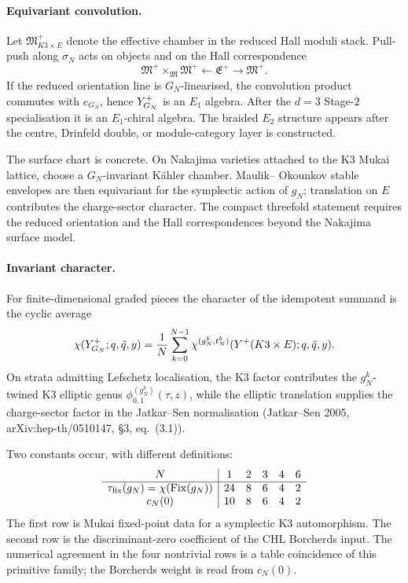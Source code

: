 \paragraph{Equivariant convolution.}
Let $\mathfrak{M}^{+}_{K3\times E}$ denote the effective chamber in the
reduced Hall moduli stack.  Pull-push along $\sigma_N$ acts on objects
and on the Hall correspondence
\[
  \mathfrak{M}^{+}\times_{\mathfrak{M}}\mathfrak{M}^{+}
  \longleftarrow
  \mathfrak{E}^{+}
  \longrightarrow
  \mathfrak{M}^{+}.
\]
If the reduced orientation line is $G_N$-linearised, the convolution
product commutes with $e_{G_N}$, hence $Y^{+}_{G_N}$ is an $E_1$ algebra.
After the $d=3$ Stage-$2$ specialisation it is an $E_1$-chiral algebra.
The braided $E_2$ structure appears after the centre, Drinfeld double,
or module-category layer is constructed.

The surface chart is concrete.  On Nakajima varieties attached to the
K3 Mukai lattice, choose a $G_N$-invariant K\"ahler chamber.  Maulik--
Okounkov stable envelopes are then equivariant for the symplectic
action of $g_N$; translation on $E$ contributes the charge-sector
character.  The compact threefold statement requires the reduced
orientation and the Hall correspondences beyond the Nakajima surface
model.

\paragraph{Invariant character.}
For finite-dimensional graded pieces the character of the idempotent
summand is the cyclic average
\[
  \chi(Y^{+}_{G_N};q,\tilde q,y)
  =
  \frac{1}{N}\sum_{k=0}^{N-1}
  \chi^{(g_N^k,t_N^k)}
  (Y^{+}(K3\times E);q,\tilde q,y).
\]
On strata admitting Lefschetz localisation, the K3 factor contributes
the $g_N^k$-twined K3 elliptic genus
$\phi^{(g_N^k)}_{0,1}(\tau,z)$, while the elliptic translation supplies
the charge-sector factor in the Jatkar--Sen normalisation
(Jatkar--Sen 2005, arXiv:hep-th/0510147, \S3, eq.~(3.1)).

Two constants occur, with different definitions:
\[
\begin{array}{c|ccccc}
N&1&2&3&4&6\\ \hline
\tau_{\mathrm{fix}}(g_N)=\chi(\mathrm{Fix}(g_N))&24&8&6&4&2\\
c_N(0)&10&8&6&4&2
\end{array}
\]
The first row is Mukai fixed-point data for a symplectic K3
automorphism.  The second row is the discriminant-zero coefficient of
the CHL Borcherds input.  The numerical agreement in the four
nontrivial rows is a table coincidence of this primitive family; the
Borcherds weight is read from $c_N(0)$.

